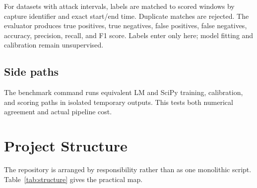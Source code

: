 \documentclass[11pt,a4paper]{article}
\begin{document}
For datasets with attack intervals, labels are matched to scored windows by capture identifier and exact start/end time. Duplicate matches are rejected. The evaluator produces true positives, true negatives, false positives, false negatives, accuracy, precision, recall, and F1 score. Labels enter only here; model fitting and calibration remain unsupervised.

\subsection{Side paths}

The benchmark command runs equivalent LM and SciPy training, calibration, and scoring paths in isolated temporary outputs. This tests both numerical agreement and actual pipeline cost.


\section{Project Structure}

The repository is arranged by responsibility rather than as one monolithic script. Table~\ref{tab:structure} gives the practical map.
\end{document}
